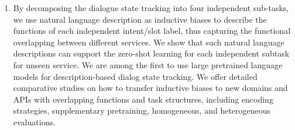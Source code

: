 \begin{enumerate}
  \item By decomposing the dialogue state tracking into four independent
  sub-tasks, we use natural language description as inductive biases
  to describe the functions of each independent intent/slot label,
  thus capturing the functional overlapping between different
  services. We show that such natural language descriptions can
  support the zero-shot learning for each independent subtask for
  unseen service. We are among the first to use large pretrained
  language models for description-based dialog state tracking. We
  offer detailed comparative studies on how to transfer inductive
  biases to new domains and APIs with overlapping functions and task
  structures, including encoding strategies, supplementary
  pretraining, homogeneous, and heterogeneous evaluations.
\end{enumerate}


